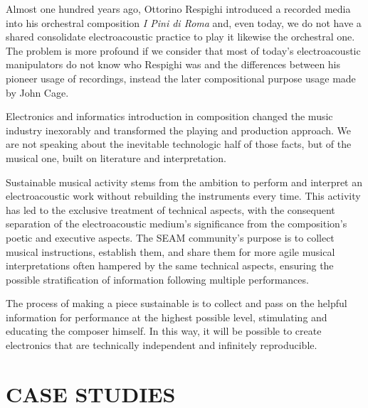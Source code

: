 Almost one hundred years ago, Ottorino Respighi introduced a recorded media into
his orchestral composition \emph{I Pini di Roma} \cite{ropr25} and, even today,
we do not have a shared consolidate electroacoustic practice to play it likewise
the orchestral one. The problem is more profound if we consider that most of
today's electroacoustic manipulators do not know who Respighi was and the
differences between his pioneer usage of recordings, instead the later
compositional purpose usage made by John Cage. \cite{cjil39}

Electronics and informatics introduction in composition changed the music industry inexorably and transformed the playing and production approach. We are not
speaking about the inevitable technologic half of those facts, but of the
musical one, built on literature and interpretation.

Sustainable musical activity stems from the ambition to perform and interpret an electroacoustic work without rebuilding the instruments every time. This
activity has led to the exclusive treatment of technical aspects, with the
consequent separation of the electroacoustic medium's significance from the
composition's poetic and executive aspects. The SEAM community's purpose is to
collect musical instructions, establish them, and share them for more agile
musical interpretations often hampered by the same technical aspects, ensuring
the possible stratification of information following multiple performances.

The process of making a piece sustainable is to collect and pass on the helpful information for performance at the highest possible level, stimulating and
educating the composer himself. In this way, it will be possible to create
electronics that are technically independent and infinitely reproducible.

\section*{CASE STUDIES}


